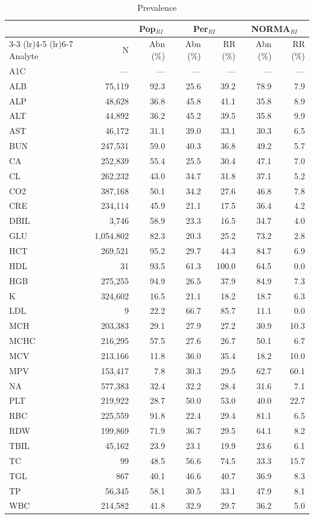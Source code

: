 \begin{table}[ht]
\centering
\footnotesize
\begin{tabular}{lrrrrrr}
\toprule
 & & \multicolumn{1}{c}{Pop$_{RI}$} & \multicolumn{2}{c}{Per$_{RI}$} & \multicolumn{2}{c}{NORMA$_{RI}$} \\
\cmidrule(lr){3-3} \cmidrule(lr){4-5} \cmidrule(lr){6-7}
Analyte & N & Abn (\%) & Abn (\%) & RR (\%) & Abn (\%) & RR (\%) \\
\midrule
A1C & --- & --- & --- & --- & --- & --- \\
ALB & 75,119 & 92.3 & 25.6 & 39.2 & 78.9 & 7.9 \\
ALP & 48,628 & 36.8 & 45.8 & 41.1 & 35.8 & 8.9 \\
ALT & 44,892 & 36.2 & 45.2 & 39.5 & 35.8 & 9.9 \\
AST & 46,172 & 31.1 & 39.0 & 33.1 & 30.3 & 6.5 \\
BUN & 247,531 & 59.0 & 40.3 & 36.8 & 49.2 & 5.7 \\
CA & 252,839 & 55.4 & 25.5 & 30.4 & 47.1 & 7.0 \\
CL & 262,232 & 43.0 & 34.7 & 31.8 & 37.1 & 5.2 \\
CO2 & 387,168 & 50.1 & 34.2 & 27.6 & 46.8 & 7.8 \\
CRE & 234,114 & 45.9 & 21.1 & 17.5 & 36.4 & 4.2 \\
DBIL & 3,746 & 58.9 & 23.3 & 16.5 & 34.7 & 4.0 \\
GLU & 1,054,802 & 82.3 & 20.3 & 25.2 & 73.2 & 2.8 \\
HCT & 269,521 & 95.2 & 29.7 & 44.3 & 84.7 & 6.9 \\
HDL & 31 & 93.5 & 61.3 & 100.0 & 64.5 & 0.0 \\
HGB & 275,255 & 94.9 & 26.5 & 37.9 & 84.9 & 7.3 \\
K & 324,602 & 16.5 & 21.1 & 18.2 & 18.7 & 6.3 \\
LDL & 9 & 22.2 & 66.7 & 85.7 & 11.1 & 0.0 \\
MCH & 203,383 & 29.1 & 27.9 & 27.2 & 30.9 & 10.3 \\
MCHC & 216,295 & 57.5 & 27.6 & 26.7 & 50.1 & 6.7 \\
MCV & 213,166 & 11.8 & 36.0 & 35.4 & 18.2 & 10.0 \\
MPV & 153,417 & 7.8 & 30.3 & 29.5 & 62.7 & 60.1 \\
NA & 577,383 & 32.4 & 32.2 & 28.4 & 31.6 & 7.1 \\
PLT & 219,922 & 28.7 & 50.0 & 53.0 & 40.0 & 22.7 \\
RBC & 225,559 & 91.8 & 22.4 & 29.4 & 81.1 & 6.5 \\
RDW & 199,869 & 71.9 & 36.7 & 29.5 & 64.1 & 8.2 \\
TBIL & 45,162 & 23.9 & 23.1 & 19.9 & 23.6 & 6.1 \\
TC & 99 & 48.5 & 56.6 & 74.5 & 33.3 & 15.7 \\
TGL & 867 & 40.1 & 46.6 & 40.7 & 36.9 & 8.3 \\
TP & 56,345 & 58.1 & 30.5 & 33.1 & 47.9 & 8.1 \\
WBC & 214,582 & 41.8 & 32.9 & 29.7 & 36.2 & 5.0 \\
\bottomrule
\end{tabular}
\caption{Prevalence}
\label{tab:prevalence}
\end{table}